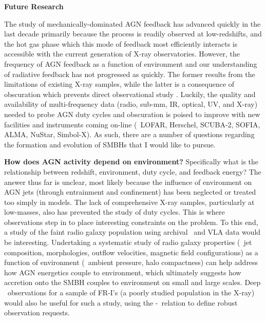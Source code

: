 \documentclass[12pt]{article}
\begin{document}
{\bfseries{Future Research}}

The study of mechanically-dominated AGN feedback has advanced quickly
in the last decade primarily because the process is readily observed
at low-redshifts, and the hot gas phase which this mode of feedback
most efficiently interacts is accessible with the current generation
of X-ray observatories. However, the frequency of AGN feedback as a
function of environment and our understanding of radiative feedback
has not progressed as quickly. The former results from the limitations
of existing X-ray samples, while the latter is a consequence of
obscuration which prevents direct observational study
\cite{2009arXiv0911.3911A}. Luckily, the quality and availability of
multi-frequency data (radio, sub-mm, IR, optical, UV, and X-ray)
needed to probe AGN duty cycles and obscuration is poised to improve
with new facilities and instruments coming on-line (\ie\ LOFAR,
Herschel, SCUBA-2, SOFIA, ALMA, NuStar, Simbol-X). As such, there are
a number of questions regarding the formation and evolution of SMBHs
that I would like to pursue.

{\bf{How does AGN activity depend on environment?}} Specifically what
is the relationship between redshift, environment, duty cycle, and
feedback energy? The answer thus far is unclear, most likely because
the influence of environment on AGN jets (through entrainment and
confinement) has been neglected or treated too simply in models. The
lack of comprehensive X-ray samples, particularly at low-masses, also
has prevented the study of duty cycles. This is where observations
step in to place interesting constraints on the problem. To this end,
a study of the faint radio galaxy population using archival \chandra\
and VLA data would be interesting. Undertaking a systematic study of
radio galaxy properties (\ie\ jet composition, morphologies, outflow
velocities, magnetic field configurations) as a function of
environment (\ie\ ambient pressure, halo compactness) can help address
how AGN energetics couple to environment, which ultimately suggests
how accretion onto the SMBH couples to environment on small and large
scales. Deep \chandra\ observations for a sample of FR-I's (a poorly
studied population in the X-ray) would also be useful for such a
study, using the \pjet-\lrad\ relation to define robust observation
requests.
\end{document}

